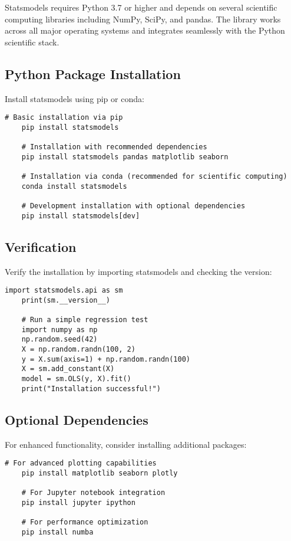 Statsmodels requires Python 3.7 or higher and depends on several scientific computing libraries including NumPy, SciPy, and pandas. The library works across all major operating systems and integrates seamlessly with the Python scientific stack.

\subsection{Python Package Installation}
\label{subsec:python_install}

Install statsmodels using pip or conda:

\begin{lstlisting}[style=bashstyle, caption={Statsmodels Installation}]
	# Basic installation via pip
	pip install statsmodels
	
	# Installation with recommended dependencies
	pip install statsmodels pandas matplotlib seaborn
	
	# Installation via conda (recommended for scientific computing)
	conda install statsmodels
	
	# Development installation with optional dependencies
	pip install statsmodels[dev]
\end{lstlisting}

\subsection{Verification}
\label{subsec:verification}

Verify the installation by importing statsmodels and checking the version:

\begin{lstlisting}[language=MyPython, caption={Statsmodels Verification}]
	import statsmodels.api as sm
	print(sm.__version__)
	
	# Run a simple regression test
	import numpy as np
	np.random.seed(42)
	X = np.random.randn(100, 2)
	y = X.sum(axis=1) + np.random.randn(100)
	X = sm.add_constant(X)
	model = sm.OLS(y, X).fit()
	print("Installation successful!")
\end{lstlisting}

\subsection{Optional Dependencies}

For enhanced functionality, consider installing additional packages:

\begin{lstlisting}[style=bashstyle, caption={Optional Dependencies}]
	# For advanced plotting capabilities
	pip install matplotlib seaborn plotly
	
	# For Jupyter notebook integration
	pip install jupyter ipython
	
	# For performance optimization
	pip install numba
\end{lstlisting}

